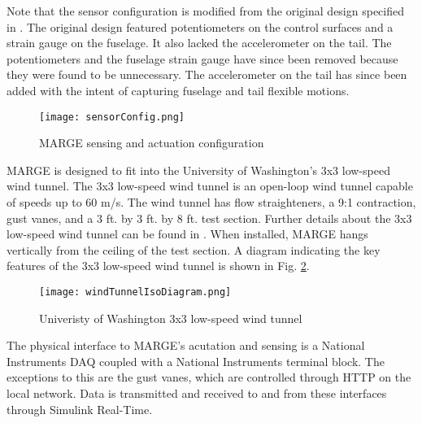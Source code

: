 Note that the sensor configuration is modified from the original design specified in \cite{Quenzer2019}. The original design featured potentiometers on the control surfaces and a strain gauge on the fuselage. It also lacked the accelerometer on the tail. The potentiometers and the fuselage strain gauge have since been removed because they were found to be unnecessary. The accelerometer on the tail has since been added with the intent of capturing fuselage and tail flexible motions.
\begin{figure}[h]
    \centering
    \texttt{[image: sensorConfig.png]}
    \caption{MARGE sensing and actuation configuration}
    \label{fig:sensorConfig}
\end{figure}

MARGE is designed to fit into the University of Washington's 3x3 low-speed wind tunnel. The 3x3 low-speed wind tunnel is an open-loop wind tunnel capable of speeds up to 60 m/s. The wind tunnel has flow straighteners, a 9:1 contraction, gust vanes, and a 3 ft. by 3 ft. by 8 ft. test section. Further details about the 3x3 low-speed wind tunnel can be found in \cite{3x3site}. When installed, MARGE hangs vertically from the ceiling of the test section. A diagram indicating the key features of the 3x3 low-speed wind tunnel is shown in Fig. \ref{fig:3x3}.
\begin{figure}[h]
    \centering
    \texttt{[image: windTunnelIsoDiagram.png]}
    \caption{Univeristy of Washington 3x3 low-speed wind tunnel}
    \label{fig:3x3}
\end{figure}

The physical interface to MARGE's acutation and sensing is a National Instruments DAQ coupled with a National Instruments terminal block. The exceptions to this are the gust vanes, which are controlled through HTTP on the local network. Data is transmitted and received to and from these interfaces through Simulink Real-Time.